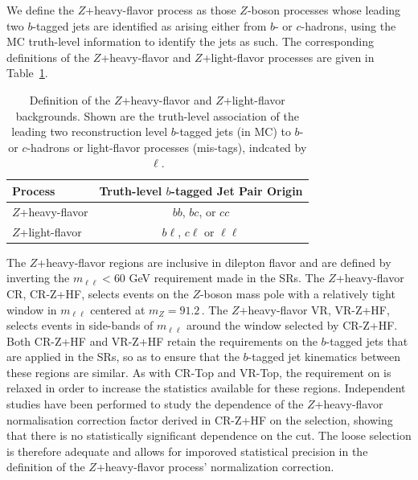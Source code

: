 We define the $Z$+heavy-flavor process as those $Z$-boson processes whose leading two $b$-tagged
jets are identified as arising either from $b$- or $c$-hadrons, using the MC truth-level information
to identify the jets as such.
The corresponding definitions of the $Z$+heavy-flavor and $Z$+light-flavor processes are given
in Table~\ref{tab:zhf_def}.

\begin{table}[!htb]
    \begin{center}
        \caption{
            Definition of the $Z$+heavy-flavor and $Z$+light-flavor backgrounds.
            Shown are the truth-level association of the leading two reconstruction level $b$-tagged
            jets (in MC) to $b$- or $c$-hadrons or light-flavor processes (mis-tags), indcated
            by $\ell$.
        }        
        \label{tab:zhf_def}
        \begin{tabular}{l|c}
        \hline
        \hline
            \textbf{Process} & \textbf{Truth-level $b$-tagged Jet Pair Origin} \\
            \hline
            $Z$+heavy-flavor & $bb$, $bc$, or $cc$ \\
            $Z$+light-flavor & $b \ell$, $c \ell$ or $\ell \ell$ \\
        \hline
        \hline
        \end{tabular}
    \end{center}
\end{table}

The $Z$+heavy-flavor regions are inclusive in dilepton flavor and are defined by inverting the $m_{\ell \ell} < 60$ GeV
requirement made in the SRs.
The $Z$+heavy-flavor CR, CR-Z+HF, selects events on the $Z$-boson mass pole with a relatively
tight window in $m_{\ell \ell}$ centered at $m_Z = 91.2$\,\GeV.
The $Z$+heavy-flavor VR, VR-Z+HF, selects events in side-bands of $m_{\ell \ell}$ around the window
selected by CR-Z+HF.
Both CR-Z+HF and VR-Z+HF retain the requirements on the $b$-tagged jets that are applied in the SRs,
so as to ensure that the $b$-tagged jet kinematics between these regions are similar.
As with CR-Top and VR-Top, the requirement on \dhh is relaxed in order to increase
the statistics available for these regions.
Independent studies have been performed to study the dependence of the $Z$+heavy-flavor normalisation correction
factor derived in CR-Z+HF on the \dhh selection, showing that there is no statistically significant
dependence on the cut. The loose \dhh selection is therefore adequate and allows for imporoved statistical
precision in the definition of the $Z$+heavy-flavor process' normalization correction.

